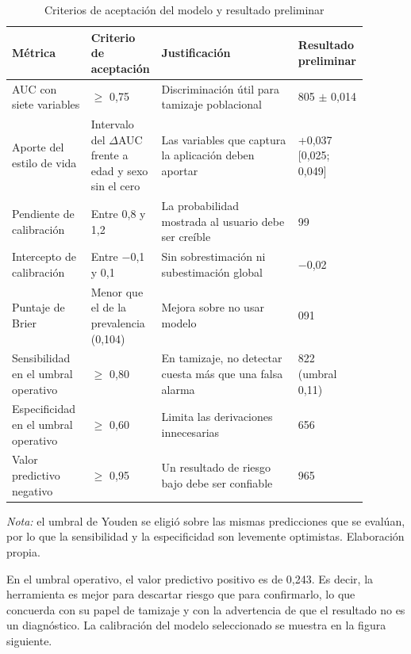 \documentclass[conference]{IEEEtran}
\begin{document}
\begin{table}[!t]
\centering
\caption{Criterios de aceptación del modelo y resultado preliminar}
\footnotesize
\renewcommand{\arraystretch}{1.15}
\begin{tabular}{>{\raggedright\arraybackslash}p{0.222\linewidth}>{\raggedright\arraybackslash}p{0.168\linewidth}>{\raggedright\arraybackslash}p{0.388\linewidth}>{\raggedright\arraybackslash}p{0.110\linewidth}}
\hline
\textbf{Métrica} & \textbf{Criterio de aceptación} & \textbf{Justificación} & \textbf{Resultado preliminar} \\ \hline
AUC con siete variables & $\geq$ 0{,}75 & Discriminación útil para tamizaje poblacional & 0{,}805 $\pm$ 0{,}014 \\ \hline
Aporte del estilo de vida & Intervalo del $\Delta$AUC frente a edad y sexo sin el cero & Las variables que captura la aplicación deben aportar & +0{,}037 [0{,}025; 0{,}049] \\ \hline
Pendiente de calibración & Entre 0{,}8 y 1{,}2 & La probabilidad mostrada al usuario debe ser creíble & 0{,}99 \\ \hline
Intercepto de calibración & Entre $-$0{,}1 y 0{,}1 & Sin sobrestimación ni subestimación global & $-$0{,}02 \\ \hline
Puntaje de Brier & Menor que el de la prevalencia (0{,}104) & Mejora sobre no usar modelo & 0{,}091 \\ \hline
Sensibilidad en el umbral operativo & $\geq$ 0{,}80 & En tamizaje, no detectar cuesta más que una falsa alarma & 0{,}822 (umbral 0{,}11) \\ \hline
Especificidad en el umbral operativo & $\geq$ 0{,}60 & Limita las derivaciones innecesarias & 0{,}656 \\ \hline
Valor predictivo negativo & $\geq$ 0{,}95 & Un resultado de riesgo bajo debe ser confiable & 0{,}965 \\ \hline
\end{tabular}
\par\smallskip\parbox{\linewidth}{\scriptsize\textit{Nota:} el umbral de Youden se eligió sobre las mismas predicciones que se evalúan, por lo que la sensibilidad y la especificidad son levemente optimistas. Elaboración propia.}
\end{table}
En el umbral operativo, el valor predictivo positivo es de 0{,}243. Es decir, la herramienta es mejor para descartar riesgo que para confirmarlo, lo que concuerda con su papel de tamizaje y con la advertencia de que el resultado no es un diagnóstico. La calibración del modelo seleccionado se muestra en la figura siguiente.
\end{document}
